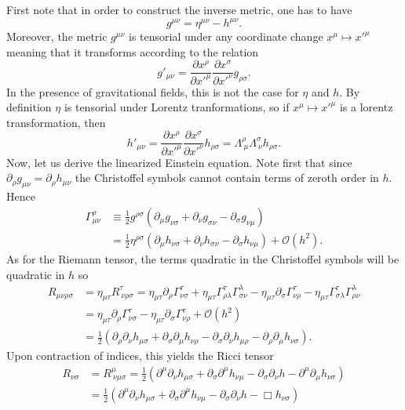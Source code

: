 \documentclass[twoside,utf8]{article}
\begin{document}
First note that in order to construct the inverse metric, one has to have
\[
g^{\mu\nu} = \eta^{\mu\nu} - h^{\mu\nu}.
\]
Moreover, the metric $g^{\mu\nu}$ is tensorial under any coordinate change $x^\mu \mapsto x'^\mu$ meaning that it transforms according to the relation
\[
g'_{\mu\nu} =
\frac{\partial x^\rho}{\partial x'^\mu}
\frac{\partial x^\sigma}{\partial x'^\nu}
g_{\rho \sigma}.
\]
In the presence of gravitational fields, this is not the case for $\eta$ and $h$. By definition $\eta$ is tensorial under Lorentz tranformations, so if $x^\mu \mapsto x'^\mu$ is a lorentz transformation, then
\[
h'_{\mu\nu}
=
\frac{\partial x^\rho}{\partial x'^\mu}
\frac{\partial x^\sigma}{\partial x'^\nu}
h_{\rho \sigma}
=
\Lambda^{\rho}_{\ \mu}
\Lambda^{\sigma}_{\ \nu}
h_{\rho \sigma}.
\]
Now, let us derive the linearized Einstein equation. Note first that since $\partial_\rho g_{\mu\nu} =\partial_\rho h_{\mu\nu}$ the Christoffel symbols cannot contain terms of zeroth order in $h$. Hence
\begin{align*}
  \Gamma^{\rho}_{\mu\nu}
  & \equiv \frac{1}{2}g^{\rho \sigma}
  \left(
  \partial_\mu g_{\nu \sigma} + \partial_\nu g_{\sigma \nu} - \partial_\sigma g_{\nu \mu}
  \right) \\
  & = \frac{1}{2}\eta^{\rho \sigma}
  \left(
  \partial_\mu h_{\nu \sigma} + \partial_\nu h_{\sigma \nu} - \partial_\sigma h_{\nu \mu}
  \right) + \mathcal{O}(h^2).
\end{align*}
As for the Riemann tensor, the terms quadratic in the Christoffel symbols will be quadratic in $h$ so
\begin{align*}
  R_{\mu \nu \rho \sigma}
 &= \eta_{\mu \tau} R^{\tau}_{ \ \nu \rho \sigma}
  =
    \eta_{\mu \tau} \partial_\rho \Gamma^\tau_{\nu \sigma}
  + \eta_{\mu \tau} \Gamma^\tau_{\rho \lambda} \Gamma^\lambda_{\sigma \nu}
  - \eta_{\mu \tau} \partial_\sigma \Gamma^\tau_{\nu \rho}
  - \eta_{\mu \tau} \Gamma^\tau_{\sigma \lambda} \Gamma^\lambda_{\rho \nu} \\
 &= \eta_{\mu \tau} \partial_\rho \Gamma^\tau_{\nu \sigma}
  - \eta_{\mu \tau} \partial_\sigma \Gamma^\tau_{\nu \rho} + \mathcal{O}(h^2) \\
 &= \frac{1}{2}\left( \partial_\rho \partial_\nu h_{\mu\sigma} + \partial_\sigma \partial_\mu h_{\nu \rho} - \partial_\sigma \partial_\nu h_{\mu\rho} - \partial_\rho \partial_\mu h_{\nu \sigma}   \right).
\end{align*}
Upon contraction of indices, this yields the Ricci tensor
\begin{align*}
  R_{\nu \sigma}
 &= R^{\mu}_{ \ \nu \mu \sigma}
  = \frac{1}{2}\left( \partial^\mu \partial_\nu h_{\mu\sigma} + \partial_\sigma \partial^\mu h_{\nu \mu} - \partial_\sigma \partial_\nu h - \partial^\mu \partial_\mu h_{\nu \sigma}   \right) \\
 &= \frac{1}{2}\left( \partial^\mu \partial_\nu h_{\mu\sigma} + \partial_\sigma \partial^\mu h_{\nu \mu} - \partial_\sigma \partial_\nu h - \Box h_{\nu \sigma}   \right)
\end{align*}
\end{document}
